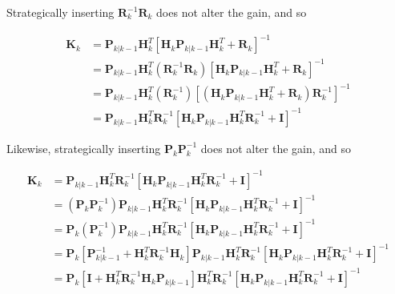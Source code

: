 Strategically inserting $\mathbf{R}_k^{-1} \mathbf{R}_k$ does not alter the gain, and so

\begin{equation*}
    \begin{aligned}
        \mathbf{K}_k
        &= \mathbf{P}_{k|k-1} \mathbf{H}_k^T \left[ \mathbf{H}_k \mathbf{P}_{k|k-1} \mathbf{H}_k^T + \mathbf{R}_k \right]^{-1} \\
        &= \mathbf{P}_{k|k-1} \mathbf{H}_k^T \left( \mathbf{R}_k^{-1} \mathbf{R}_k \right) \left[ \mathbf{H}_k \mathbf{P}_{k|k-1} \mathbf{H}_k^T + \mathbf{R}_k \right]^{-1} \\
        &= \mathbf{P}_{k|k-1} \mathbf{H}_k^T \left( \mathbf{R}_k^{-1} \right) \left[ \left( \mathbf{H}_k \mathbf{P}_{k|k-1} \mathbf{H}_k^T + \mathbf{R}_k \right) \mathbf{R}_k^{-1} \right]^{-1} \\
        &= \mathbf{P}_{k|k-1} \mathbf{H}_k^T \mathbf{R}_k^{-1} \left[ \mathbf{H}_k \mathbf{P}_{k|k-1} \mathbf{H}_k^T \mathbf{R}_k^{-1} + \mathbf{I} \right]^{-1}
    \end{aligned}
\end{equation*}

Likewise, strategically inserting $\mathbf{P}_k \mathbf{P}_k^{-1}$ does not alter the gain, and so

\begin{equation*}
    \begin{aligned}
        \mathbf{K}_k
        &= \mathbf{P}_{k|k-1} \mathbf{H}_k^T \mathbf{R}_k^{-1} \left[ \mathbf{H}_k \mathbf{P}_{k|k-1} \mathbf{H}_k^T \mathbf{R}_k^{-1} + \mathbf{I} \right]^{-1} \\
        &= \left( \mathbf{P}_k \mathbf{P}_k^{-1} \right)
        \mathbf{P}_{k|k-1} \mathbf{H}_k^T \mathbf{R}_k^{-1} \left[ \mathbf{H}_k \mathbf{P}_{k|k-1} \mathbf{H}_k^T \mathbf{R}_k^{-1} + \mathbf{I} \right]^{-1} \\
        &= \mathbf{P}_k \left( \mathbf{P}_k^{-1} \right)
        \mathbf{P}_{k|k-1} \mathbf{H}_k^T \mathbf{R}_k^{-1} \left[ \mathbf{H}_k \mathbf{P}_{k|k-1} \mathbf{H}_k^T \mathbf{R}_k^{-1} + \mathbf{I} \right]^{-1} \\
        &= \mathbf{P}_k \left[ \mathbf{P}_{k|k-1}^{-1} + \mathbf{H}_k^T \mathbf{R}_k^{-1} \mathbf{H}_k \right]
        \mathbf{P}_{k|k-1} \mathbf{H}_k^T \mathbf{R}_k^{-1} \left[ \mathbf{H}_k \mathbf{P}_{k|k-1} \mathbf{H}_k^T \mathbf{R}_k^{-1} + \mathbf{I} \right]^{-1} \\
        &= \mathbf{P}_k \left[ \mathbf{I} + \mathbf{H}_k^T \mathbf{R}_k^{-1} \mathbf{H}_k \mathbf{P}_{k|k-1} \right]
        \mathbf{H}_k^T \mathbf{R}_k^{-1} \left[ \mathbf{H}_k \mathbf{P}_{k|k-1} \mathbf{H}_k^T \mathbf{R}_k^{-1} + \mathbf{I} \right]^{-1}
    \end{aligned}
\end{equation*}

